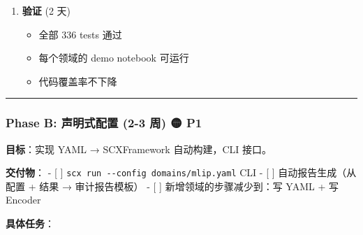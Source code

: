 \documentclass[
  12pt,
]{ctexart}
\providecommand{\tightlist}{%
  \setlength{\itemsep}{0pt}\setlength{\parskip}{0pt}}
\begin{document}
\begin{enumerate}
  \begin{itemize}
  \tightlist
  \item
    定义 YAML schema
  \item
    实现 \texttt{ConfigLoader.from\_yaml(path)} → \texttt{SCXConfig}
  \item
    三个示例配置：\texttt{mlip.yaml}, \texttt{health.yaml},
    \texttt{cifar.yaml}
  \end{itemize}
\item
  \textbf{验证} (2 天)

  \begin{itemize}
  \tightlist
  \item
    全部 336 tests 通过
  \item
    每个领域的 demo notebook 可运行
  \item
    代码覆盖率不下降
  \end{itemize}
\end{enumerate}

\begin{center}\rule{0.5\linewidth}{0.5pt}\end{center}

\subsubsection{Phase B: 声明式配置 (2-3 周) 🟡
P1}\label{phase-b-ux58f0ux660eux5f0fux914dux7f6e-2-3-ux5468-p1}

\textbf{目标}：实现 YAML → SCXFramework 自动构建，CLI 接口。

\textbf{交付物}： - {[} {]}
\texttt{scx\ run\ -\/-config\ domains/mlip.yaml} CLI - {[} {]}
自动报告生成（从配置 + 结果 → 审计报告模板） - {[} {]}
新增领域的步骤减少到：写 YAML + 写 Encoder

\textbf{具体任务}：
\end{document}
